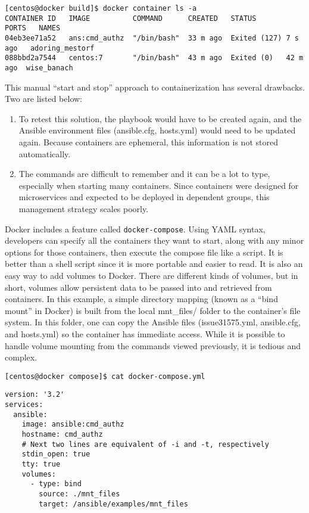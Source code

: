 \begin{verbatim}
[centos@docker build]$ docker container ls -a
CONTAINER ID   IMAGE          COMMAND      CREATED   STATUS         PORTS   NAMES
04eb3ee71a52   ans:cmd_authz  "/bin/bash"  33 m ago  Exited (127) 7 s ago   adoring_mestorf
088bbd2a7544   centos:7       "/bin/bash"  43 m ago  Exited (0)   42 m ago  wise_banach
\end{verbatim}

This manual ``start and stop'' approach to containerization has several
drawbacks. Two are listed below:
\begin{enumerate}
  \item	To retest this solution, the playbook would have to be created again,
  and the Ansible environment files (ansible.cfg, hosts.yml) would need to be
  updated again. Because containers are ephemeral, this information is not
  stored automatically.
  \item	The commands are difficult to remember and it can be a lot to type,
  especially when starting many containers. Since containers were designed for
  microservices and expected to be deployed in dependent groups, this
  management strategy scales poorly.
\end{enumerate}
  
Docker includes a feature called \verb|docker-compose|. Using YAML syntax,
developers can specify all the containers they want to start, along with any minor
options for those containers, then execute the compose file like a script. It
is better than a shell script since it is more portable and easier to read. It
is also an easy way to add volumes to Docker. There are different kinds of
volumes, but in short, volumes allow persistent data to be passed into and
retrieved from containers. In this example, a simple directory mapping (known
as a ``bind mount'' in Docker) is built from the local mnt\_files/ folder to the
container's file system. In this folder, one can copy the Ansible files
(issue31575.yml, ansible.cfg, and hosts.yml) so the container has immediate
access. While it is possible to handle volume mounting from the commands
viewed previously, it is tedious and complex.

\begin{verbatim}
[centos@docker compose]$ cat docker-compose.yml 
\end{verbatim}

\begin{verbatim}
version: '3.2'
services:
  ansible:
    image: ansible:cmd_authz
    hostname: cmd_authz
    # Next two lines are equivalent of -i and -t, respectively
    stdin_open: true
    tty: true
    volumes:
      - type: bind
        source: ./mnt_files
        target: /ansible/examples/mnt_files
\end{verbatim}

